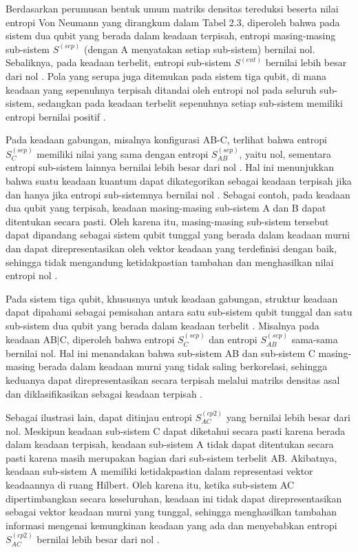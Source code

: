 \par
Berdasarkan perumusan bentuk umum matriks densitas tereduksi beserta nilai entropi Von Neumann yang dirangkum dalam Tabel 2.3, diperoleh bahwa pada sistem dua qubit yang berada dalam keadaan terpisah, entropi masing-masing sub-sistem $S^{(sep)}$ (dengan A menyatakan setiap sub-sistem) bernilai nol. Sebaliknya, pada keadaan terbelit, entropi sub-sistem $S^{(ent)}$ bernilai lebih besar dari nol \cite{nielsen2010quantum,wehrl1978general}. Pola yang serupa juga ditemukan pada sistem tiga qubit, di mana keadaan yang sepenuhnya terpisah ditandai oleh entropi nol pada seluruh sub-sistem, sedangkan pada keadaan terbelit sepenuhnya setiap sub-sistem memiliki entropi bernilai positif \cite{horodecki2009quantum}.
\par
Pada keadaan gabungan, misalnya konfigurasi AB-C, terlihat bahwa entropi $S_{C}^{(sep)}$ memiliki nilai yang sama dengan entropi $S_{AB}^{(sep)}$, yaitu nol, sementara entropi sub-sistem lainnya bernilai lebih besar dari nol \cite{dur2000three}. Hal ini menunjukkan bahwa suatu keadaan kuantum dapat dikategorikan sebagai keadaan terpisah jika dan hanya jika entropi sub-sistemnya bernilai nol \cite{nielsen2010quantum,bengtsson2017geometry}. Sebagai contoh, pada keadaan dua qubit yang terpisah, keadaan masing-masing sub-sistem A dan B dapat ditentukan secara pasti. Oleh karena itu, masing-masing sub-sistem tersebut dapat dipandang sebagai sistem qubit tunggal yang berada dalam keadaan murni dan dapat direpresentasikan oleh vektor keadaan yang terdefinisi dengan baik, sehingga tidak mengandung ketidakpastian tambahan dan menghasilkan nilai entropi nol \cite{wehrl1978general}.
\par
Pada sistem tiga qubit, khususnya untuk keadaan gabungan, struktur keadaan dapat dipahami sebagai pemisahan antara satu sub-sistem qubit tunggal dan satu sub-sistem dua qubit yang berada dalam keadaan terbelit \cite{dur2000three}. Misalnya pada keadaan AB$|$C, diperoleh bahwa entropi $S_{C}^{(sep)}$ dan entropi $S_{AB}^{(sep)}$ sama-sama bernilai nol. Hal ini menandakan bahwa sub-sistem AB dan sub-sistem C masing-masing berada dalam keadaan murni yang tidak saling berkorelasi, sehingga keduanya dapat direpresentasikan secara terpisah melalui matriks densitas asal dan diklasifikasikan sebagai keadaan terpisah \cite{horodecki2009quantum}.
\par
Sebagai ilustrasi lain, dapat ditinjau entropi $S_{AC}^{(cp2)}$ yang bernilai lebih besar dari nol. Meskipun keadaan sub-sistem C dapat diketahui secara pasti karena berada dalam keadaan terpisah, keadaan sub-sistem A tidak dapat ditentukan secara pasti karena masih merupakan bagian dari sub-sistem terbelit AB. Akibatnya, keadaan sub-sistem A memiliki ketidakpastian dalam representasi vektor keadaannya di ruang Hilbert. Oleh karena itu, ketika sub-sistem AC dipertimbangkan secara keseluruhan, keadaan ini tidak dapat direpresentasikan sebagai vektor keadaan murni yang tunggal, sehingga menghasilkan tambahan informasi mengenai kemungkinan keadaan yang ada dan menyebabkan entropi $S_{AC}^{(cp2)}$ bernilai lebih besar dari nol \cite{nielsen2010quantum,horodecki2009quantum}.
